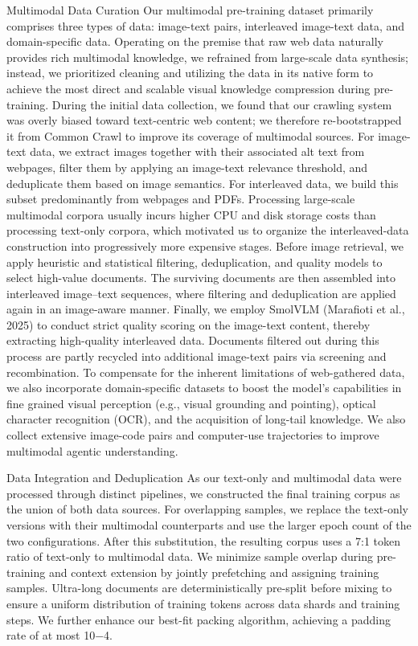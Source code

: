 \documentclass[
  10
]{article}
\begin{document}
Multimodal Data Curation Our multimodal pre-training dataset primarily
comprises three types of data: image-text pairs, interleaved image-text
data, and domain-specific data. Operating on the premise that raw web
data naturally provides rich multimodal knowledge, we refrained from
large-scale data synthesis; instead, we prioritized cleaning and
utilizing the data in its native form to achieve the most direct and
scalable visual knowledge compression during pre-training. During the
initial data collection, we found that our crawling system was overly
biased toward text-centric web content; we therefore re-bootstrapped it
from Common Crawl to improve its coverage of multimodal sources. For
image-text data, we extract images together with their associated alt
text from webpages, filter them by applying an image-text relevance
threshold, and deduplicate them based on image semantics. For
interleaved data, we build this subset predominantly from webpages and
PDFs. Processing large-scale multimodal corpora usually incurs higher
CPU and disk storage costs than processing text-only corpora, which
motivated us to organize the interleaved-data construction into
progressively more expensive stages. Before image retrieval, we apply
heuristic and statistical filtering, deduplication, and quality models
to select high-value documents. The surviving documents are then
assembled into interleaved image--text sequences, where filtering and
deduplication are applied again in an image-aware manner. Finally, we
employ SmolVLM (Marafioti et al., 2025) to conduct strict quality
scoring on the image-text content, thereby extracting high-quality
interleaved data. Documents filtered out during this process are partly
recycled into additional image-text pairs via screening and
recombination. To compensate for the inherent limitations of
web-gathered data, we also incorporate domain-specific datasets to boost
the model's capabilities in fine grained visual perception (e.g., visual
grounding and pointing), optical character recognition (OCR), and the
acquisition of long-tail knowledge. We also collect extensive image-code
pairs and computer-use trajectories to improve multimodal agentic
understanding.

Data Integration and Deduplication As our text-only and multimodal data
were processed through distinct pipelines, we constructed the final
training corpus as the union of both data sources. For overlapping
samples, we replace the text-only versions with their multimodal
counterparts and use the larger epoch count of the two configurations.
After this substitution, the resulting corpus uses a 7:1 token ratio of
text-only to multimodal data. We minimize sample overlap during
pre-training and context extension by jointly prefetching and assigning
training samples. Ultra-long documents are deterministically pre-split
before mixing to ensure a uniform distribution of training tokens across
data shards and training steps. We further enhance our best-fit packing
algorithm, achieving a padding rate of at most 10−4.
\end{document}
